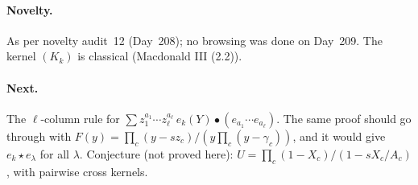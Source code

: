 \documentclass[11pt]{amsart}
\theoremstyle{remark}
\begin{document}
\paragraph{Novelty.} As per novelty audit~12 (Day~208); no browsing was done on Day~209. The kernel $(K_k)$ is classical (Macdonald III (2.2)).

\paragraph{Next.} The $\ell$-column rule for $\sum z_1^{a_1}\cdots z_\ell^{a_\ell}\,e_k(Y)\bullet(e_{a_1}\cdots e_{a_\ell})$. The same proof should go through with $F(y)=\prod_c(y-sz_c)/(y\prod_c(y-\gamma_c))$, and it would give $e_k\star e_\lambda$ for all $\lambda$. Conjecture (not proved here): $U=\prod_c(1-X_c)/(1-sX_c/A_c)$, with pairwise cross kernels.
\end{document}
